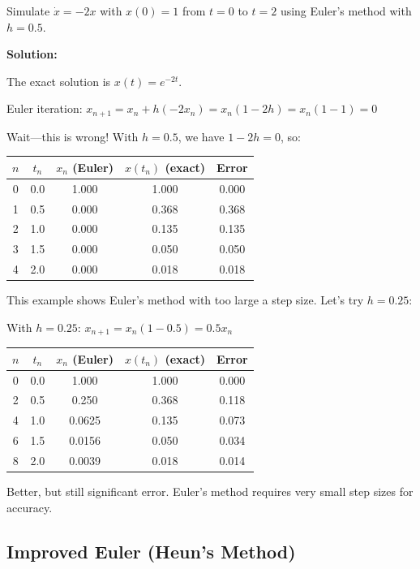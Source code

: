 \begin{examplebox}[title=Example 11.6: Euler's Method for a First-Order System]
Simulate $\dot{x} = -2x$ with $x(0) = 1$ from $t = 0$ to $t = 2$ using Euler's method with $h = 0.5$.

\textbf{Solution:}

The exact solution is $x(t) = e^{-2t}$.

Euler iteration: $x_{n+1} = x_n + h(-2x_n) = x_n(1 - 2h) = x_n(1 - 1) = 0$

Wait---this is wrong! With $h = 0.5$, we have $1 - 2h = 0$, so:

\begin{center}
\begin{tabular}{ccccc}
\toprule
$n$ & $t_n$ & $x_n$ (Euler) & $x(t_n)$ (exact) & Error \\
\midrule
0 & 0.0 & 1.000 & 1.000 & 0.000 \\
1 & 0.5 & 0.000 & 0.368 & 0.368 \\
2 & 1.0 & 0.000 & 0.135 & 0.135 \\
3 & 1.5 & 0.000 & 0.050 & 0.050 \\
4 & 2.0 & 0.000 & 0.018 & 0.018 \\
\bottomrule
\end{tabular}
\end{center}

This example shows Euler's method with too large a step size. Let's try $h = 0.25$:

With $h = 0.25$: $x_{n+1} = x_n(1 - 0.5) = 0.5 x_n$

\begin{center}
\begin{tabular}{ccccc}
\toprule
$n$ & $t_n$ & $x_n$ (Euler) & $x(t_n)$ (exact) & Error \\
\midrule
0 & 0.0 & 1.000 & 1.000 & 0.000 \\
2 & 0.5 & 0.250 & 0.368 & 0.118 \\
4 & 1.0 & 0.0625 & 0.135 & 0.073 \\
6 & 1.5 & 0.0156 & 0.050 & 0.034 \\
8 & 2.0 & 0.0039 & 0.018 & 0.014 \\
\bottomrule
\end{tabular}
\end{center}

Better, but still significant error. Euler's method requires very small step sizes for accuracy.
\end{examplebox}

\subsection{Improved Euler (Heun's Method)}

